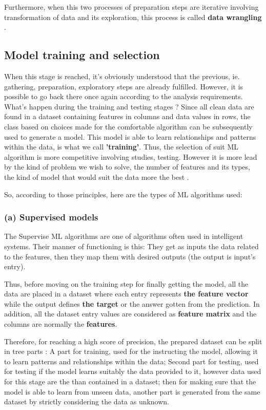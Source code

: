 \documentclass[12pt,a4paper]{report}
\begin{document}
Furthermore, when this two processes of preparation steps are iterative involving transformation of data and its exploration, this process is called \textbf{data wrangling} \cite{furche2016data} . 
\subsection{Model training and selection}
When this stage is reached, it's obviously understood that the previous, ie. gathering, preparation, exploratory steps are already fulfilled. However, it is possible to go back there once again according to the analysis requirements.
What's happen during the training and testing stages ?
Since all clean data are found in a dataset containing features in columns and data values in rows, the class based on choices made for the comfortable algorithm can be subsequently used to generate a model. This model is able to learn relationships and patterns within the data, is what we call \textbf{'training'}. 
Thus, the selection of suit ML algorithm is more competitive involving studies, testing. However it is more lead by the kind of problem we wish to solve, the number of features and its types, the kind of model that would suit the data more the best \cite{wang2016machine}. 

So, according to those principles, here are the types of ML algorithms used:


\subsubsection{(a) Supervised models}  
The Supervise ML algorithms are one of algorithms often  used in intelligent systems. Their manner of functioning is this: They get as inputs the data related to the features, then they map them  with desired outputs (the output is input's entry). 

Thus, before moving on the training step for finally getting the model, all the data are placed in a dataset where each entry represents \textbf{the feature vector} while the output defines \textbf{the target} or the answer gotten from the prediction. In addition, all the dataset entry values are considered as \textbf{feature matrix} and the columns are normally the \textbf{features}. 

Therefore, for reaching a high score of precision, the prepared dataset can be split in tree parts : A part for training, used for the instructing the model, allowing it to learn patterns and relationships within the data; Second part for testing, used for testing if the model learns suitably the data provided to it, however data used for this stage are the than contained in a dataset; then for making sure that the model is able to learn from unseen data, another part is generated from the same dataset by strictly considering the data as unknown. 
\end{document}
